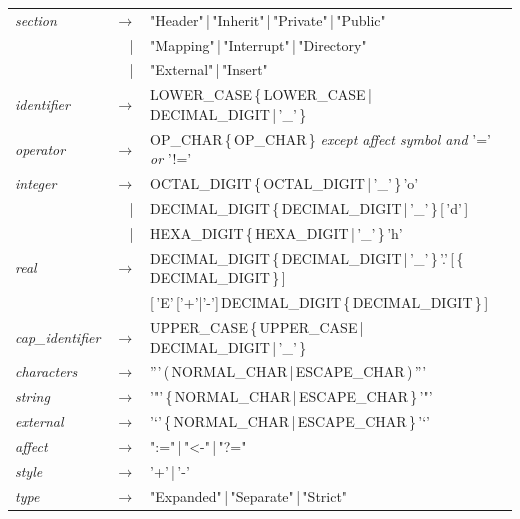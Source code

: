 \documentclass[11pt]{mybook}
\begin{document}
\noindent
{\tt\begin{tabular}{lrl}
{\it{}section} & $\rightarrow$ & "Header"\,|\,"Inherit"\,|\,"Private"\,|\,"Public"\\
               & |\,           & "Mapping"\,|\,"Interrupt"\,|\,"Directory"\\
               & |\,           & "External"\,|\,"Insert"\\

{\it{}identifier} & $\rightarrow$ & LOWER\_CASE\,\{\,LOWER\_CASE\,|\,DECIMAL\_DIGIT\,|\,'\_'\,\}\\

{\it{}operator}   & $\rightarrow$ & OP\_CHAR\,\{\,OP\_CHAR\,\} {\it{}except affect symbol and } '=' {\it{}or} '!='\\

{\it{}integer}    & $\rightarrow$ & OCTAL\_DIGIT\,\{\,OCTAL\_DIGIT\,|\,'\_'\,\}\,'o'\\
                  & |\,           & DECIMAL\_DIGIT\,\{\,DECIMAL\_DIGIT\,|\,'\_'\,\}\,[\,'d'\,]\\
                  & |\,           & HEXA\_DIGIT\,\{\,HEXA\_DIGIT\,|\,'\_'\,\}\,'h'\\

{\it{}real}       & $\rightarrow$ & DECIMAL\_DIGIT\,\{\,DECIMAL\_DIGIT\,|\,'\_'\,\}\,'.'\,[\,\{\,DECIMAL\_DIGIT\,\}\,]\\
{}                &               & [\,'E'\,['+'|'-']\,DECIMAL\_DIGIT\,\{\,DECIMAL\_DIGIT\,\}\,]\\

{\it{}cap\_identifier} & $\rightarrow$ & UPPER\_CASE\,\{\,UPPER\_CASE\,|\,DECIMAL\_DIGIT\,|\,'\_'\,\}\\

{\it{}characters}  & $\rightarrow$ & '''\,(\,NORMAL\_CHAR\,|\,ESCAPE\_CHAR\,)\,'''\\

{\it{}string}      & $\rightarrow$ & '"'\,\{\,NORMAL\_CHAR\,|\,ESCAPE\_CHAR\,\}\,'"'\\

{\it{}external}    & $\rightarrow$ & '`'\,\{\,NORMAL\_CHAR\,|\,ESCAPE\_CHAR\,\}\,'`'\\

{\it{}affect}      & $\rightarrow$ & ":="\,|\,"<-"\,|\,"?="\\

{\it{}style}       & $\rightarrow$ & '+'\,|\,'-'\\

{\it{}type}        & $\rightarrow$ & "Expanded"\,|\,"Separate"\,|\,"Strict"\\


\end{tabular}}
\end{document}
